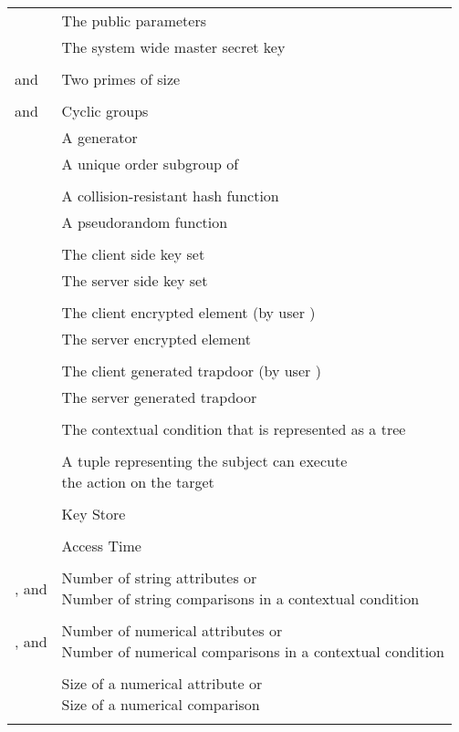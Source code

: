 \documentclass[epsfig,a4paper,11pt,titlepage]{book}
\numberwithin{algorithm}{chapter}
\begin{document}
\begin{longtable}{l l}

 & The public parameters \\
 & The system wide master secret key \\ \\
 and  & Two primes of size  \\ \\
 and   & Cyclic groups \\
 & A generator \\
 & A unique order subgroup of  \\ \\
 & A collision-resistant hash function \\
 & A pseudorandom function \\ \\
 & The client side key set \\
 & The server side key set \\ \\
 & The client encrypted element (by user ) \\
 & The server encrypted element \\ \\
 & The client generated trapdoor (by user ) \\
 & The server generated trapdoor \\ \\
 & The contextual condition that is represented as a tree \\ \\
 & \makecell[l]{A tuple representing the subject  can execute \\ the action  on the target } \\ \\
 & Key Store \\ \\
 & Access Time \\ \\
,  and  & \makecell[l]{Number of string attributes or \\ Number of string comparisons in a contextual condition} \\ \\
,  and  & \makecell[l]{Number of numerical attributes or \\ Number of numerical comparisons in a contextual condition} \\ \\
 & \makecell[l]{Size of a numerical attribute or \\ Size of a numerical comparison} \\ \\

\end{longtable}
\end{document}
